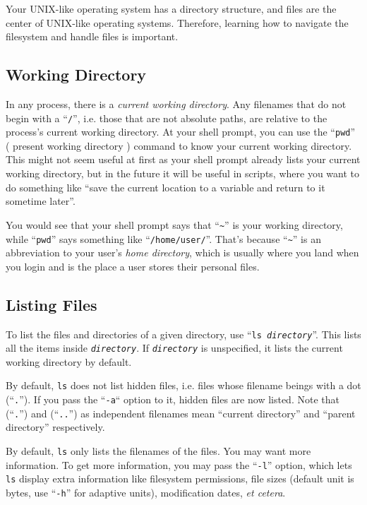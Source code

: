 \documentclass{extbook}
\newcommand\ph[1]{\texttt{\textit{#1}}}
\begin{document}
Your UNIX-like operating system has a directory structure, and files are the center of UNIX-like operating systems.  Therefore, learning how to navigate the filesystem and handle files is important.

\subsection{Working Directory}

In any process, there is a \textit{current working directory}.  Any filenames that do not begin with a ``\verb|/|'', i.e. those that are not absolute paths, are relative to the process's current working directory.  At your shell prompt, you can use the ``\verb|pwd|'' ( present working directory ) command to know your current working directory.  This might not seem useful at first as your shell prompt already lists your current working directory, but in the future it will be useful in scripts, where you want to do something like ``save the current location to a variable and return to it sometime later''.

You would see that your shell prompt says that ``\verb|~|'' is your working directory, while ``\verb|pwd|'' says something like ``\verb|/home/user/|''.  That's because ``\verb|~|'' is an abbreviation to your user's \textit{home directory}, which is usually where you land when you login and is the place a user stores their personal files.

\subsection{Listing Files}

To list the files and directories of a given directory, use ``\texttt{ls \ph{directory}}''.  This lists all the items inside \ph{directory}.  If \ph{directory} is unspecified, it lists the current working directory by default.

By default, \verb|ls| does not list hidden files, i.e. files whose filename beings with a dot (``\verb|.|'').  If you pass the ``\verb|-a|`` option to it, hidden files are now listed.  Note that (``\verb|.|'') and (``\verb|..|'') as independent filenames mean ``current directory'' and ``parent directory'' respectively.

By default, \verb|ls| only lists the filenames of the files.  You may want more information.  To get more information, you may pass the ``\verb|-l|'' option, which lets \verb|ls| display extra information like filesystem permissions, file sizes (default unit is bytes, use ``\verb|-h|'' for adaptive units), modification dates, \textit{et cetera}.
\end{document}
